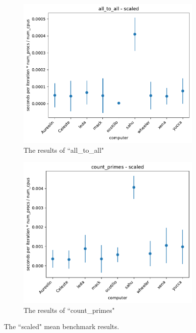 \documentclass{article}
\begin{document}
\begin{figure}[h!]
    \centering
    \begin{subfigure}[b]{0.49\textwidth}
         \centering
         \includegraphics[width=\textwidth]{figures/final/all_to_all_scaled.pdf}
         \caption{The results of ``all\_to\_all"}
         \label{fig:all_to_all}
     \end{subfigure}
     \hfill
     \begin{subfigure}[b]{0.49\textwidth}
         \centering
         \includegraphics[width=\textwidth]{figures/final/count_primes_scaled.pdf}
         \caption{The results of ``count\_primes"}
         \label{fig:asdf}
     \end{subfigure}
     \hfill
    \caption{The ``scaled" mean benchmark results. }
    \label{fig:scaled}
\end{figure}
\end{document}
